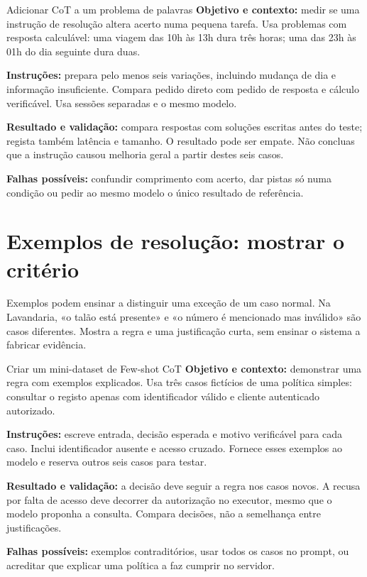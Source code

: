 \begin{promptlabbox}{Adicionar CoT a um problema de palavras}
\textbf{Objetivo e contexto:} medir se uma instrução de resolução altera acerto numa pequena tarefa. Usa problemas com resposta calculável: uma viagem das 10h às 13h dura três horas; uma das 23h às 01h do dia seguinte dura duas.

\textbf{Instruções:} prepara pelo menos seis variações, incluindo mudança de dia e informação insuficiente. Compara pedido direto com pedido de resposta e cálculo verificável. Usa sessões separadas e o mesmo modelo.

\textbf{Resultado e validação:} compara respostas com soluções escritas antes do teste; regista também latência e tamanho. O resultado pode ser empate. Não concluas que a instrução causou melhoria geral a partir destes seis casos.

\textbf{Falhas possíveis:} confundir comprimento com acerto, dar pistas só numa condição ou pedir ao mesmo modelo o único resultado de referência.
\end{promptlabbox}

\section{Exemplos de resolução: mostrar o critério}
Exemplos podem ensinar a distinguir uma exceção de um caso normal. Na Lavandaria, «o talão está presente» e «o número é mencionado mas inválido» são casos diferentes. Mostra a regra e uma justificação curta, sem ensinar o sistema a fabricar evidência.

\begin{promptlabbox}{Criar um mini-dataset de Few-shot CoT}
\textbf{Objetivo e contexto:} demonstrar uma regra com exemplos explicados. Usa três casos fictícios de uma política simples: consultar o registo apenas com identificador válido e cliente autenticado autorizado.

\textbf{Instruções:} escreve entrada, decisão esperada e motivo verificável para cada caso. Inclui identificador ausente e acesso cruzado. Fornece esses exemplos ao modelo e reserva outros seis casos para testar.

\textbf{Resultado e validação:} a decisão deve seguir a regra nos casos novos. A recusa por falta de acesso deve decorrer da autorização no executor, mesmo que o modelo proponha a consulta. Compara decisões, não a semelhança entre justificações.

\textbf{Falhas possíveis:} exemplos contraditórios, usar todos os casos no prompt, ou acreditar que explicar uma política a faz cumprir no servidor.
\end{promptlabbox}

